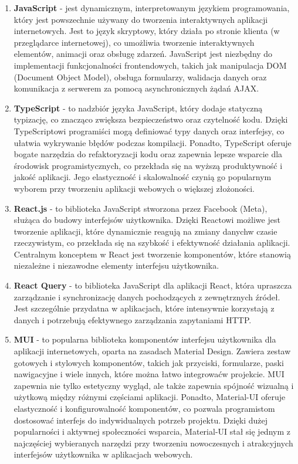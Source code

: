 \begin{enumerate}

    \item {\bf JavaScript} - jest dynamicznym, interpretowanym językiem programowania, który jest powszechnie używany do tworzenia interaktywnych aplikacji internetowych. Jest to język skryptowy, który działa po stronie klienta (w przeglądarce internetowej), co umożliwia tworzenie interaktywnych elementów, animacji oraz obsługę zdarzeń. JavaScript jest niezbędny do implementacji funkcjonalności frontendowych, takich jak manipulacja DOM (Document Object Model), obsługa formularzy, walidacja danych oraz komunikacja z serwerem za pomocą asynchronicznych żądań AJAX.
    
    \item {\bf TypeScript} - to nadzbiór języka JavaScript, który dodaje statyczną typizację, co znacząco zwiększa bezpieczeństwo oraz czytelność kodu. Dzięki TypeScriptowi programiści mogą definiować typy danych oraz interfejsy, co ułatwia wykrywanie błędów podczas kompilacji. Ponadto, TypeScript oferuje bogate narzędzia do refaktoryzacji kodu oraz zapewnia lepsze wsparcie dla środowisk programistycznych, co przekłada się na wyższą produktywność i jakość aplikacji. Jego elastyczność i skalowalność czynią go popularnym wyborem przy tworzeniu aplikacji webowych o większej złożoności.
    
    \item {\bf React.js} - to biblioteka JavaScript stworzona przez Facebook (Meta), służąca do budowy interfejsów użytkownika. Dzięki Reactowi możliwe jest tworzenie aplikacji, które dynamicznie reagują na zmiany danych\linebreak w czasie rzeczywistym, co przekłada się na szybkość i efektywność działania aplikacji. Centralnym konceptem w React jest tworzenie komponentów, które stanowią niezależne i niezawodne elementy interfejsu użytkownika.

    \item {\bf React Query} - to biblioteka JavaScript dla aplikacji React, która upraszcza zarządzanie i synchronizację danych pochodzących z zewnętrznych źródeł. Jest szczególnie przydatna w aplikacjach, które intensywnie korzystają z danych i potrzebują efektywnego zarządzania zapytaniami HTTP.
    
    \item {\bf MUI} - to popularna biblioteka komponentów interfejsu użytkownika dla aplikacji internetowych, oparta na zasadach Material Design. Zawiera zestaw gotowych i stylowych komponentów, takich jak przyciski, formularze, paski nawigacyjne i wiele innych, które można łatwo integrować\linebreak w projekcie. MUI zapewnia nie tylko estetyczny wygląd, ale także zapewnia spójność wizualną i użytkową między różnymi częściami aplikacji. Ponadto, Material-UI oferuje elastyczność i konfigurowalność komponentów, co pozwala programistom dostosować interfejs do indywidualnych potrzeb projektu. Dzięki dużej popularności i aktywnej społeczności wsparcia, Material-UI stał się jednym z najczęściej wybieranych narzędzi przy tworzeniu nowoczesnych i atrakcyjnych interfejsów użytkownika \linebreak w aplikacjach webowych.
    

\end{enumerate}
